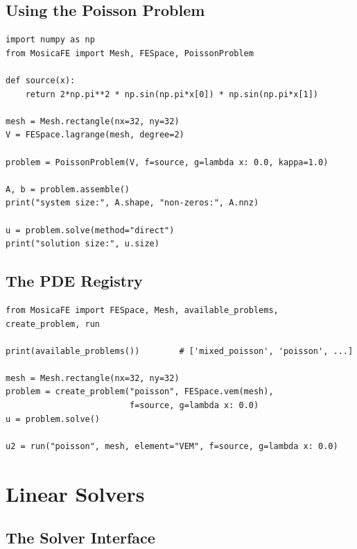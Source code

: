\documentclass[11pt,oneside]{book}
\theoremstyle{definition}
\theoremstyle{plain}
\begin{document}
\section{Using the Poisson Problem}

\begin{lstlisting}[language=MosicaFE,caption={Assembling and solving}]
import numpy as np
from MosicaFE import Mesh, FESpace, PoissonProblem

def source(x):
    return 2*np.pi**2 * np.sin(np.pi*x[0]) * np.sin(np.pi*x[1])

mesh = Mesh.rectangle(nx=32, ny=32)
V = FESpace.lagrange(mesh, degree=2)

problem = PoissonProblem(V, f=source, g=lambda x: 0.0, kappa=1.0)

A, b = problem.assemble()
print("system size:", A.shape, "non-zeros:", A.nnz)

u = problem.solve(method="direct")
print("solution size:", u.size)
\end{lstlisting}

\section{The PDE Registry}

\begin{lstlisting}[language=MosicaFE,caption={Creating and solving equations by name}]
from MosicaFE import FESpace, Mesh, available_problems, create_problem, run

print(available_problems())        # ['mixed_poisson', 'poisson', ...]

mesh = Mesh.rectangle(nx=32, ny=32)
problem = create_problem("poisson", FESpace.vem(mesh),
                         f=source, g=lambda x: 0.0)
u = problem.solve()

u2 = run("poisson", mesh, element="VEM", f=source, g=lambda x: 0.0)
\end{lstlisting}

\chapter{Linear Solvers}
\label{chap:solvers}

\section{The Solver Interface}
\end{document}
